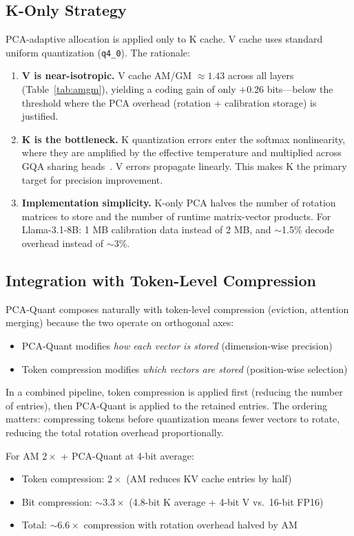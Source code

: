 \subsection{K-Only Strategy}
\label{sec:k-only}

PCA-adaptive allocation is applied only to K cache. V cache uses standard uniform quantization (\texttt{q4\_0}). The rationale:

\begin{enumerate}
    \item \textbf{V is near-isotropic.} V cache AM/GM $\approx 1.43$ across all layers (Table~\ref{tab:amgm}), yielding a coding gain of only $+0.26$ bits---below the threshold where the PCA overhead (rotation + calibration storage) is justified.
    \item \textbf{K is the bottleneck.} K quantization errors enter the softmax nonlinearity, where they are amplified by the effective temperature and multiplied across GQA sharing heads~\citep{paper1}. V errors propagate linearly. This makes K the primary target for precision improvement.
    \item \textbf{Implementation simplicity.} K-only PCA halves the number of rotation matrices to store and the number of runtime matrix-vector products. For Llama-3.1-8B: 1 MB calibration data instead of 2 MB, and $\sim$1.5\% decode overhead instead of $\sim$3\%.
\end{enumerate}

\subsection{Integration with Token-Level Compression}
\label{sec:integration}

PCA-Quant composes naturally with token-level compression (eviction, attention merging) because the two operate on orthogonal axes:

\begin{itemize}
    \item PCA-Quant modifies \emph{how each vector is stored} (dimension-wise precision)
    \item Token compression modifies \emph{which vectors are stored} (position-wise selection)
\end{itemize}

In a combined pipeline, token compression is applied first (reducing the number of entries), then PCA-Quant is applied to the retained entries. The ordering matters: compressing tokens before quantization means fewer vectors to rotate, reducing the total rotation overhead proportionally.

For AM $2\times$ + PCA-Quant at 4-bit average:
\begin{itemize}
    \item Token compression: $2\times$ (AM reduces KV cache entries by half)
    \item Bit compression: $\sim$$3.3\times$ (4.8-bit K average + 4-bit V vs.\ 16-bit FP16)
    \item Total: $\sim$$6.6\times$ compression with rotation overhead halved by AM
\end{itemize}
